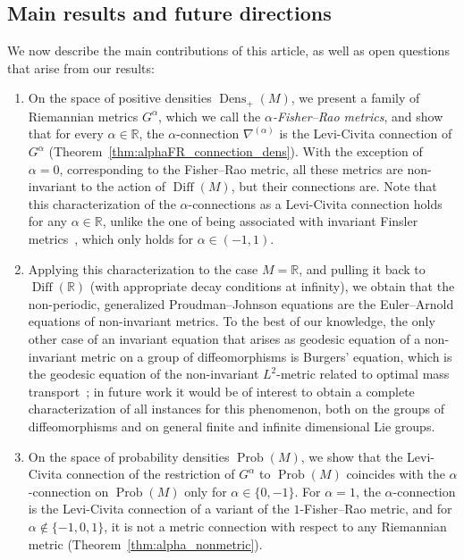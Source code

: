 \documentclass[11pt,reqno]{amsart}
\theoremstyle{definition}
\newcommand{\R}{\mathbb R}
\newcommand{\Prob}{\operatorname{Prob}(M)}
\newcommand{\Dens}{\operatorname{Dens}_+(M)}
\newcommand{\Diff}{\operatorname{Diff}(M)}
\newcommand{\DiffR}{\operatorname{Diff}(\mathbb R)}
\begin{document}
\subsection{Main results and future directions}
We now describe the main contributions of this article, as well as open questions that arise from our results:
\begin{enumerate}
\item 
    On the space of positive densities $\Dens$, we present a family of Riemannian metrics $G^\alpha$, which we call the \emph{$\alpha$-Fisher--Rao metrics}, and show that for every $\alpha\in \R$, the $\alpha$-connection $\nabla^{(\alpha)}$ is the Levi-Civita connection of $G^\alpha$ (Theorem~\ref{thm:alphaFR_connection_dens}). 
    With the exception of $\alpha=0$, corresponding to the Fisher--Rao metric, all these metrics are non-invariant to the action of $\Diff$, but their connections are. 
    Note that this characterization of the $\alpha$-connections as a Levi-Civita connection holds for any $\alpha\in \R$, unlike %
  the one of being associated with invariant Finsler metrics~\cite{bauer2024p}, which only holds for $\alpha\in (-1,1)$.
\item 
    Applying this characterization to the case $M=\R$, and pulling it back to $\DiffR$ (with appropriate decay conditions at infinity),
    we obtain that the non-periodic, generalized Proudman--Johnson equations are the Euler--Arnold equations of non-invariant metrics.
    To the best of our knowledge, the only other case of an invariant equation that arises as geodesic equation of a non-invariant metric on a group of diffeomorphisms is Burgers' equation, which is the geodesic equation of the non-invariant $L^2$-metric related to optimal mass transport~\cite{otto2001geometry}; in future work it would be of interest to obtain a complete characterization of all instances for this phenomenon, both on the groups of diffeomorphisms and on general finite and infinite dimensional Lie groups. 
\item 
    On the space of probability densities $\Prob$, we show that the Levi-Civita connection of the restriction of  $G^\alpha$ to $\Prob$ coincides with the $\alpha$-connection  on $\Prob$ only for $\alpha\in \{0,-1\}$.
    For $\alpha=1$, the $\alpha$-connection is the Levi-Civita connection of a variant of the $1$-Fisher--Rao metric, and for $\alpha\notin \{-1,0,1\}$, it is not a metric connection with respect to any Riemannian metric (Theorem~\ref{thm:alpha_nonmetric}).

\end{enumerate}
\end{document}
